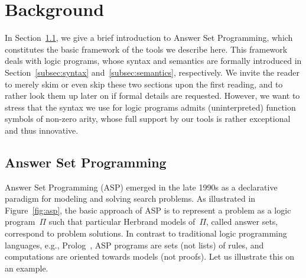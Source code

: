 \section{Background}\label{sec:background}

In Section~\ref{subsec:asp},
we give a brief introduction to Answer Set Programming,
which constitutes the basic framework of the tools we describe here.
This framework deals with logic programs,
whose syntax and semantics are formally introduced in
Section~\ref{subsec:syntax} and~\ref{subsec:semantics}, respectively.
We invite the reader to merely skim or even skip these two sections
upon the first reading, and to rather look them up later on if
formal details are requested.
However, we want to stress that the syntax we use for logic programs
admits (uninterpreted) function symbols of non-zero arity,
whose full support by our tools is rather exceptional and thus innovative.



\subsection{Answer Set Programming}\label{subsec:asp}

Answer Set Programming (ASP)
\cite{baral03a,gelleo02a,lifschitz02a,martru99a,niemela99a}
emerged in the late 1990s as a declarative paradigm
for modeling and solving search problems.
As illustrated in Figure~\ref{fig:asp},
the basic approach of ASP is to represent a problem as a logic program~$\Pi$
such that particular Herbrand models of~$\Pi$, called answer sets,
correspond to problem solutions.
In contrast to traditional logic programming languages,
e.g., Prolog~\cite{nilmal95a},
ASP programs are sets (not lists) of rules,
and computations are oriented towards models (not proofs).
Let us illustrate this on an example.

